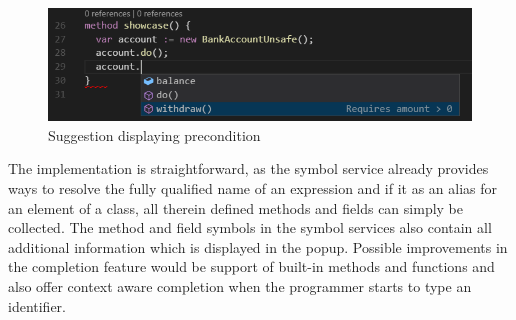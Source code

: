  \begin{figure}[H]
	\centering
	\includegraphics[width=1\textwidth]{img/codeCompletionMethod}
	\caption{Suggestion displaying precondition}
	\label{fig:codecompletionmethod}
\end{figure}
The implementation is straightforward, as the symbol service already provides ways to resolve the fully qualified name of an expression and if it as an alias for an element of a class, all therein defined methods and fields can simply be collected. The method and field symbols in the symbol services also contain all additional information which is displayed in the popup. Possible improvements in the completion feature would be support of built-in methods and functions and also offer context aware completion when the programmer starts to type an identifier. 
